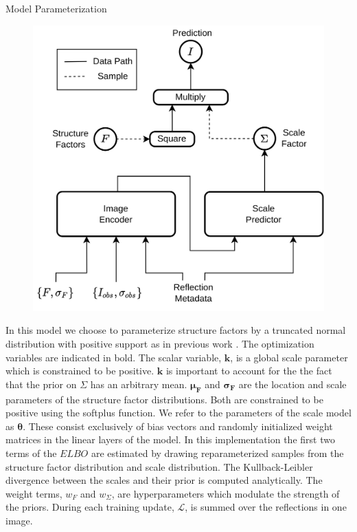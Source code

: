 \documentclass[final]{beamer}
\newlength{\colwidth}
\begin{document}
\begin{frame}[t]
\begin{columns}[t]
\begin{column}{\colwidth}
\begin{alertblock}{Model Parameterization}
\begin{minipage}{0.5\textwidth}
\begin{figure}
            \includegraphics[width=\textwidth]{figures/model/overall.png}
        \end{figure}
    \end{minipage}

    In this model we choose to parameterize structure factors by a truncated normal distribution with positive support as in previous work \cite{dalton_careless_2021}. The optimization variables are indicated in bold. The scalar variable, $\mathbf{k}$, is a global scale parameter which is constrained to be positive. $\mathbf{k}$ is important to account for the the fact that the prior on $\Sigma$ has an arbitrary mean. $\mathbf{\mu_F}$ and $\mathbf{\sigma_F}$ are the location and scale parameters of the structure factor distributions. Both are constrained to be positive using the softplus function. We refer to the parameters of the scale model as $\mathbf{\theta}$. These consist exclusively of bias vectors and randomly initialized weight matrices in the linear layers of the model. In this implementation the first two terms of the $ELBO$ are estimated by drawing reparameterized samples \cite{kingma_auto-encoding_2014} from the structure factor distribution and scale distribution. The Kullback-Leibler divergence between the scales and their prior is computed analytically. The weight terms, $w_F$ and $w_\Sigma$, are hyperparameters which modulate the strength of the priors. During each training update, $\mathcal{L}$, is summed over the reflections in one image. 
  \end{alertblock}


\end{column}
\end{columns}
\end{frame}
\end{document}
